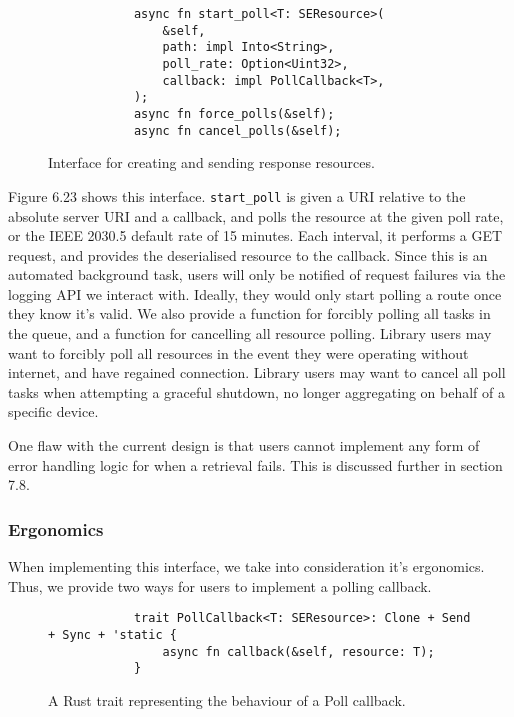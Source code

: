 \begin{figure}[h]
    \begin{center}
        \begin{lstlisting}
            async fn start_poll<T: SEResource>(
                &self,
                path: impl Into<String>,
                poll_rate: Option<Uint32>,
                callback: impl PollCallback<T>,
            );
            async fn force_polls(&self);
            async fn cancel_polls(&self);
        \end{lstlisting}
        \label{fig:pollinterface}
        \vspace{-10pt}
        \caption{Interface for creating and sending response resources.}
    \end{center}
\end{figure}

Figure 6.23 shows this interface. \texttt{start\_poll} is given a URI relative to the absolute server URI and a callback, and polls the resource at the given poll rate, or the IEEE 2030.5 default rate of 15 minutes. Each interval, it performs a GET request, and provides the deserialised resource to the callback. Since this is an automated background task, users will only be notified of request failures via the logging API we interact with. Ideally, they would only start polling a route once they know it's valid.
We also provide a function for forcibly polling all tasks in the queue, and a function for cancelling all resource polling. Library users may want to forcibly poll all resources in the event they were operating without internet, and have regained connection. Library users may want to cancel all poll tasks when attempting a graceful shutdown, no longer aggregating on behalf of a specific device.

One flaw with the current design is that users cannot implement any form of error handling logic for when a retrieval fails. This is discussed further in section 7.8.

\subsubsection{Ergonomics}
When implementing this interface, we take into consideration it's ergonomics. Thus, we provide two ways for users to implement a polling callback.


\begin{figure}[h]
    \begin{center}
        \begin{lstlisting}
            trait PollCallback<T: SEResource>: Clone + Send + Sync + 'static {
                async fn callback(&self, resource: T);
            }
        \end{lstlisting}
        \label{fig:polltrait}
        \vspace{-10pt}
        \caption{A Rust trait representing the behaviour of a Poll callback.}
    \end{center}
\end{figure}

